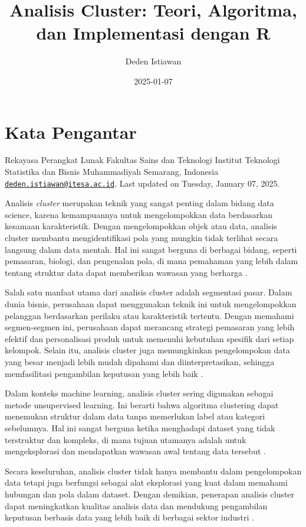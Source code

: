 \documentclass[
  oneside]{book}
\title{Analisis Cluster: Teori, Algoritma, dan Implementasi dengan R}
\author{Deden Istiawan}
\date{2025-01-07}
\begin{document}
\maketitle

{
\setcounter{tocdepth}{1}
\tableofcontents
}
\chapter*{Kata Pengantar}\label{kata-pengantar}

Rekayasa Perangkat Lunak
Fakultas Sains dan Teknologi Institut Teknologi Statistika dan
Bisnis Muhammadiyah Semarang, Indonesia
\href{mailto:deden.istiawan@itesa.ac.id}{\nolinkurl{deden.istiawan@itesa.ac.id}}.
Last updated on Tuesday, January 07, 2025.

Analisis \emph{cluster} merupakan teknik yang sangat penting dalam bidang data
science, karena kemampuannya untuk mengelompokkan data berdasarkan
kesamaan karakteristik. Dengan mengelompokkan objek atau data, analisis
cluster membantu mengidentifikasi pola yang mungkin tidak terlihat
secara langsung dalam data mentah. Hal ini sangat berguna di berbagai
bidang, seperti pemasaran, biologi, dan pengenalan pola, di mana
pemahaman yang lebih dalam tentang struktur data dapat memberikan
wawasan yang berharga \citep{kaufman:clustering1990}.

Salah satu manfaat utama dari analisis cluster adalah segmentasi pasar.
Dalam dunia bisnis, perusahaan dapat menggunakan teknik ini untuk
mengelompokkan pelanggan berdasarkan perilaku atau karakteristik
tertentu. Dengan memahami segmen-segmen ini, perusahaan dapat merancang
strategi pemasaran yang lebih efektif dan personalisasi produk untuk
memenuhi kebutuhan spesifik dari setiap kelompok. Selain itu, analisis
cluster juga memungkinkan pengelompokan data yang besar menjadi lebih
mudah dipahami dan diinterpretasikan, sehingga memfasilitasi pengambilan
keputusan yang lebih baik \citep{han2012mining}.

Dalam konteks machine learning, analisis cluster sering digunakan
sebagai metode unsupervised learning. Ini berarti bahwa algoritma
clustering dapat menemukan struktur dalam data tanpa memerlukan label
atau kategori sebelumnya. Hal ini sangat berguna ketika menghadapi
dataset yang tidak terstruktur dan kompleks, di mana tujuan utamanya
adalah untuk mengeksplorasi dan mendapatkan wawasan awal tentang data
tersebut \citep{jain2010}.

Secara keseluruhan, analisis cluster tidak hanya membantu dalam
pengelompokan data tetapi juga berfungsi sebagai alat eksplorasi yang
kuat dalam memahami hubungan dan pola dalam dataset. Dengan demikian,
penerapan analisis cluster dapat meningkatkan kualitas analisis data dan
mendukung pengambilan keputusan berbasis data yang lebih baik di
berbagai sektor industri .
\end{document}
